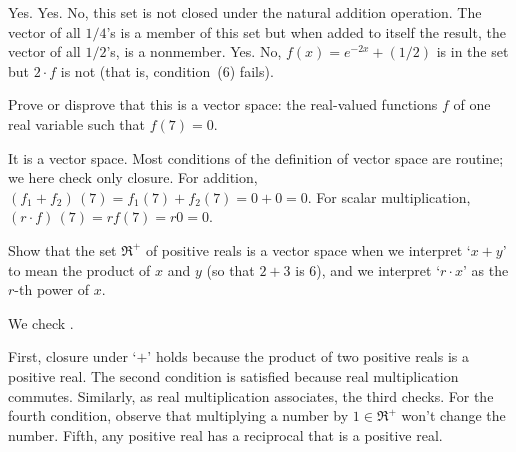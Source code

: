 \begin{exercises}
\begin{answer}
\begin{exparts}
        \partsitem Yes.
        \partsitem Yes.
        \partsitem No, this set is not closed under the natural addition
          operation.
          The vector of all $1/4$'s is a member of this set 
          but when added to itself the result, the 
          vector of all $1/2$'s, is a nonmember.
        \partsitem Yes.
        \partsitem No, \( f(x)=e^{-2x}+(1/2) \) is in the set but 
           \( 2\cdot f \) is not (that is, condition~(6) fails).
      \end{exparts}  
    \end{answer}
  \recommended \item
    Prove or disprove that this is a vector space: the real-valued functions
    \( f \) of one real variable such that \( f(7)=0 \).
    \begin{answer}
      It is a vector space.
      Most conditions of the definition of vector space are routine; we here
      check only closure.
      For addition,
      \( (f_1+f_2)\,(7)=f_1(7)+f_2(7)=0+0=0 \).
      For scalar multiplication,
      \( (r\cdot f)\,(7)=rf(7)=r0=0 \).  
    \end{answer}
  \recommended \item
    Show that the set \( \Re^+ \) of positive reals
    is a vector space when we interpret `\( x+y \)' to mean
    the product of \( x \) and \( y \) (so that \( 2+3 \) is \( 6 \)),
    and we interpret `\( r\cdot x \)' as the \( r \)-th power of \( x \).
    \begin{answer}
      We check .

      First, closure under `\( + \)'
      holds because the product of two positive reals is
      a positive real.
      The second condition is satisfied because real multiplication commutes.
      Similarly, as real multiplication associates, the third checks.
      For the fourth condition, observe that multiplying a number by
      \( 1\in\Re^+ \) won't change the number.
      Fifth, any positive real has a reciprocal that is a positive real.


\end{answer}
\end{exercises}

